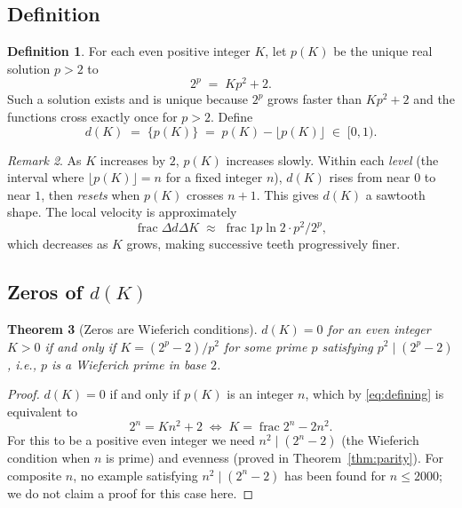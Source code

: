 \documentclass[12pt,a4paper]{article}
\newtheorem{theorem}{Theorem}[section]
\theoremstyle{definition}
\newtheorem{definition}[theorem]{Definition}
\theoremstyle{remark}
\newtheorem{remark}[theorem]{Remark}
\newcommand{\frac}{\operatorname{frac}}   %
\begin{document}
\subsection{Definition}

\begin{definition}
For each even positive integer $K$, let $p(K)$ be the unique real
solution $p > 2$ to
\begin{equation}\label{eq:defining}
  2^p \;=\; K p^2 + 2.
\end{equation}
Such a solution exists and is unique because $2^p$ grows faster than
$Kp^2 + 2$ and the functions cross exactly once for $p > 2$. Define
\begin{equation}\label{eq:sawtooth}
  d(K) \;=\; \{p(K)\} \;=\; p(K) - \lfloor p(K)\rfloor \;\in\; [0,1).
\end{equation}
\end{definition}

\begin{remark}
As $K$ increases by $2$, $p(K)$ increases slowly. Within each
\emph{level} (the interval where $\lfloor p(K)\rfloor = n$ for a fixed
integer $n$), $d(K)$ rises from near $0$ to near $1$, then
\emph{resets} when $p(K)$ crosses $n+1$. This gives $d(K)$ a sawtooth
shape. The local velocity is approximately
\[
  \frac{\Delta d}{\Delta K} \;\approx\;
  \frac{1}{p \ln 2 \cdot p^2/2^p},
\]
which decreases as $K$ grows, making successive teeth progressively
finer.
\end{remark}

\subsection{Zeros of \texorpdfstring{$d(K)$}{d(K)}}

\begin{theorem}[Zeros are Wieferich conditions]
\label{thm:zeros}
$d(K) = 0$ for an even integer $K > 0$ if and only if
$K = (2^p - 2)/p^2$ for some prime $p$ satisfying $p^2 \mid (2^p-2)$,
i.e., $p$ is a Wieferich prime in base $2$.
\end{theorem}

\begin{proof}
$d(K)=0$ if and only if $p(K)$ is an integer $n$, which by
\eqref{eq:defining} is equivalent to
\[
  2^n = Kn^2 + 2
  \;\iff\;
  K = \frac{2^n - 2}{n^2}.
\]
For this to be a positive even integer we need $n^2 \mid (2^n-2)$ (the
Wieferich condition when $n$ is prime) and evenness (proved in
Theorem~\ref{thm:parity}). For composite $n$, no example satisfying
$n^2 \mid (2^n-2)$ has been found for $n \le 2000$; we do not claim a
proof for this case here.
\end{proof}
\end{document}
